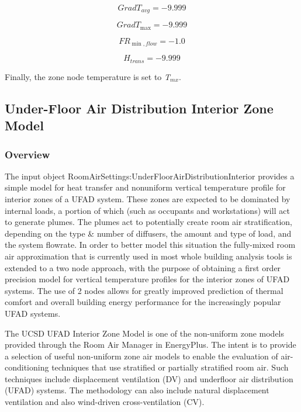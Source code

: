 {\begin{equation}
Grad{T_{avg}} =  - 9.999
\end{equation}

\begin{equation}
Grad{T_{\max }} =  - 9.999
\end{equation}

\begin{equation}
F{R_{\min ,flow}} =  - 1.0
\end{equation}

\begin{equation}
{H_{trans}} =  - 9.999
\end{equation}

Finally, the zone node temperature is set to \emph{T\(_{mx}\)}.

\subsection{Under-Floor Air Distribution Interior Zone Model}\label{under-floor-air-distribution-interior-zone-model}

\subsubsection{Overview}\label{overview-1-001}

The input object RoomAirSettings:UnderFloorAirDistributionInterior provides a simple model for heat transfer and nonuniform vertical temperature profile for interior zones of a UFAD system. These zones are expected to be dominated by internal loads, a portion of which (such as occupants and workstations) will act to generate plumes. The plumes act to potentially create room air stratification, depending on the type \& number of diffusers, the amount and type of load, and the system flowrate. In order to better model this situation the fully-mixed room air approximation that is currently used in most whole building analysis tools is extended to a two node approach, with the purpose of obtaining a first order precision model for vertical temperature profiles for the interior zones of UFAD systems. The use of 2 nodes allows for greatly improved prediction of thermal comfort and overall building energy performance for the increasingly popular UFAD systems.

The UCSD UFAD Interior Zone Model is one of the non-uniform zone models provided through the Room Air Manager in EnergyPlus. The intent is to provide a selection of useful non-uniform zone air models to enable the evaluation of air-conditioning techniques that use stratified or partially stratified room air. Such techniques include displacement ventilation (DV) and underfloor air distribution (UFAD) systems. The methodology can also include natural displacement ventilation and also wind-driven cross-ventilation (CV).

}
